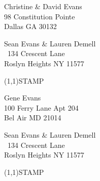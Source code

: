 \documentclass[12pt]{article}
\begin{document}
\begin{center} \begin{Huge} \vspace*{\fill}
Christine \& David Evans\\
98 Constitution Pointe\\
Dallas GA 30132\\
\vspace{\fill} \end{Huge} \end{center}

\clearpage

\begin{minipage}{.5\linewidth} \noindent
Sean Evans \& Lauren Demell\\\ 
134 Crescent Lane\\ 
Roslyn Heights NY 11577
\end{minipage}
\begin{minipage}{.5\linewidth \hspace{-.2in} \vspace{-.3in}}
\begin{flushright}
\framebox(1,1){STAMP}
\end{flushright}
\end{minipage}

\begin{center} \begin{Huge} \vspace*{\fill}
Gene Evans\\
100 Ferry Lane Apt 204\\
Bel Air MD 21014\\
\vspace{\fill} \end{Huge} \end{center}

\clearpage

\begin{minipage}{.5\linewidth} \noindent
Sean Evans \& Lauren Demell\\\ 
134 Crescent Lane\\ 
Roslyn Heights NY 11577
\end{minipage}
\begin{minipage}{.5\linewidth \hspace{-.2in} \vspace{-.3in}}
\begin{flushright}
\framebox(1,1){STAMP}
\end{flushright}
\end{minipage}
\end{document}
